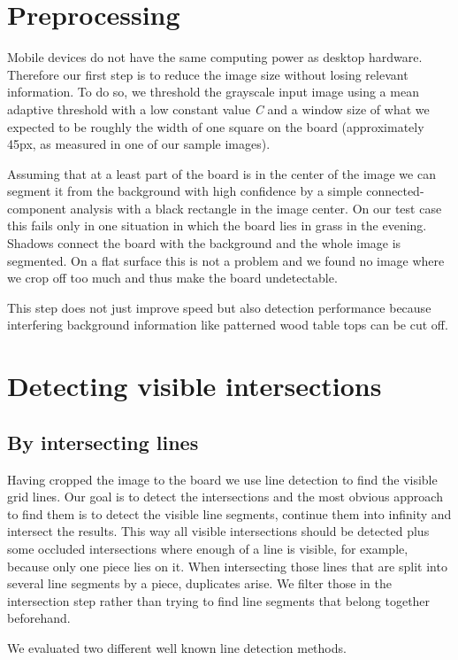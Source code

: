 	\section{Preprocessing}
	\label{detector-preprocessing}
	Mobile devices do not have the same computing power as desktop hardware. Therefore our first step is to reduce the image size without losing relevant information. To do so, we threshold the grayscale input image using a mean adaptive threshold with a low constant value \emph{C} and a window size of what we expected to be roughly the width of one square on the board (approximately 45px, as measured in one of our sample images).

	Assuming that at a least part of the board is in the center of the image we can segment it from the background with high confidence by a simple connected-component analysis with a black rectangle in the image center. On our test case this fails only in one situation in which the board lies in grass in the evening. Shadows connect the board with the background and the whole image is segmented. On a flat surface this is not a problem and we found no image where we crop off too much and thus make the board undetectable.

	This step does not just improve speed but also detection performance because interfering background information like patterned wood table tops can be cut off.

	\section{Detecting visible intersections}
	\subsection{By intersecting lines}
	Having cropped the image to the board we use line detection to find the visible grid lines. Our goal is to detect the intersections and the most obvious approach to find them is to detect the visible line segments, continue them into infinity and intersect the results. This way all visible intersections should be detected plus some occluded intersections where enough of a line is visible, for example, because only one piece lies on it. When intersecting those lines that are split into several line segments by a piece, duplicates arise. We filter those in the intersection step rather than trying to find line segments that belong together beforehand.

	We evaluated two different well known line detection methods.

